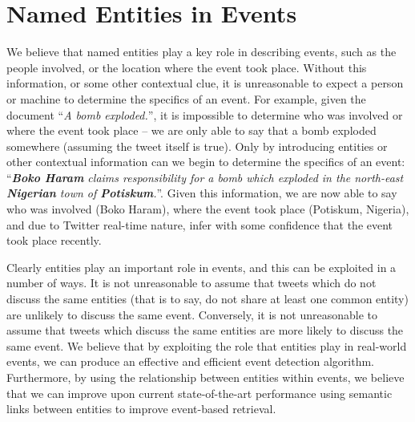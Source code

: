 


\section{Named Entities in Events}
\label{detection:sec:entityEvents}
We believe that named entities play a key role in describing events, such as the people involved, or the location where the event took place.
Without this information, or some other contextual clue, it is unreasonable to expect a person or machine to determine the specifics of an event.
For example, given the document ``\textit{A bomb exploded.}'', it is impossible to determine who was involved or where the event took place -- we are only able to say that a bomb exploded somewhere (assuming the tweet itself is true).
Only by introducing entities or other contextual information can we begin to determine the specifics of an event: ``\textit{\textbf{Boko Haram} claims responsibility for a bomb which exploded in the north-east \textbf{Nigerian} town of \textbf{Potiskum}.}''.
Given this information, we are now able to say who was involved (Boko Haram), where the event took place (Potiskum, Nigeria), and due to Twitter real-time nature, infer with some confidence that the event took place recently.

Clearly entities play an important role in events, and this can be exploited in a number of ways.
It is not unreasonable to assume that tweets which do not discuss the same entities (that is to say, do not share at least one common entity) are unlikely to discuss the same event. Conversely, it is not unreasonable to assume that tweets which discuss the same entities are more likely to discuss the same event.
We believe that by exploiting the role that entities play in real-world events, we can produce an effective and efficient event detection algorithm.
Furthermore, by using the relationship between entities within events, we believe that we can improve upon current state-of-the-art performance using semantic links between entities to improve event-based retrieval.

